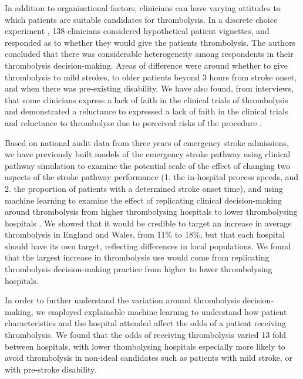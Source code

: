 In addition to organisational factors, clinicians can have varying attitudes to which patients are suitable candidates for thrombolysis. In a discrete choice experiment \cite{de_brun_factors_2018}, 138 clinicians considered hypothetical patient vignettes, and responded as to whether they would give the patients thrombolysis. The authors concluded that there was considerable heterogeneity among respondents in their thrombolysis decision-making. Areas of difference were around whether to give thrombolysis to mild strokes, to older patients beyond 3 hours from stroke onset, and when there was pre-existing disability. We have also found, from interviews, that some clinicians express a lack of faith in the clinical trials of thrombolysis and demonstrated a reluctance to expressed a lack of faith in the clinical trials and reluctance to thrombolyse due to perceived risks of the procedure \cite{jarvie_stroke_2024}.

Based on national audit data from three years of emergency stroke admissions, we have previously built models of the emergency stroke pathway using clinical pathway simulation to examine the potential scale of the effect of changing two aspects of the stroke pathway performance (1. the in-hospital process speeds, and 2. the proportion of patients with a determined stroke onset time), and using machine learning to examine the effect of replicating clinical decision-making around thrombolysis from higher thrombolysing hospitals to lower thrombolysing hospitals \cite{allen_using_2022, allen_use_2022}. We showed that it would be credible to target an increase in average thrombolysis in England and Wales, from 11\% to 18\%, but that each hospital should have its own target, reflecting differences in local populations. We found that the largest increase in thrombolysis use would come from replicating thrombolysis decision-making practice from higher to lower thrombolysing hospitals.

In order to further understand the variation around thrombolysis decision-making, we employed explainable machine learning to understand how patient characteristics and the hospital attended affect the odds of a patient receiving thrombolysis\cite{pearn_what_2023}. We found that the odds of receiving thrombolysis varied 13 fold between hospitals, with lower thombolysing hospitals especially more likely to avoid thrombolysis in non-ideal candidates such as patients with mild stroke, or with pre-stroke disability.


